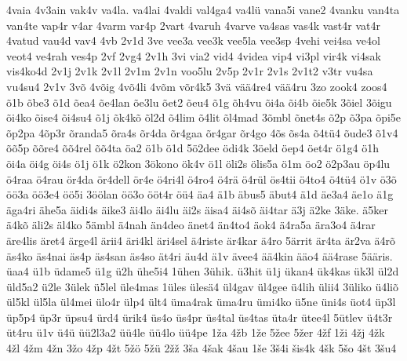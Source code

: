 {4vaia
4v3ain
vak4v
va4la.
va4lai
4valdi
val4ga4
va4lü
vana5i
vane2
4vanku
van4ta
van4te
vap4r
v4ar
4varm
var4p
2vart
4varuh
4varve
va4sas
vas4k
vast4r
vat4r
4vatud
vau4d
vav4
4vb
2v1d
3ve
vee3a
vee3k
vee5la
vee3sp
4vehi
vei4sa
ve4ol
veot4
ve4rah
ves4p
2vf
2vg4
2v1h
3vi
via2
vid4
4videa
vip4
vi3pl
vir4k
vi4sak
vis4ko4d
2v1j
2v1k
2v1l
2v1m
2v1n
voo5lu
2v5p
2v1r
2v1s
2v1t2
v3tr
vu4sa
vu4su4
2v1v
3võ
4võig
4võ4li
4võm
võr4k5
3vä
vää4re4
vää4ru
3zo
zook4
zoos4
õ1b
õbe3
õ1d
õea4
õe4lan
õe3lu
õet2
õeu4
õ1g
õh4vu
õi4a
õi4b
õie5k
3õiel
3õigu
õi4ko
õise4
õi4su4
õ1j
õk4kõ
õl2d
õ4lim
õ4lit
õl4mad
3õmbl
õnet4s
õ2p
õ3pa
õpi5e
õp2pa
4õp3r
õranda5
õra4s
õr4da
õr4gaa
õr4gar
õr4go
4õs
õs4a
õ4tü4
õude3
õ1v4
õõ5p
õõre4
õõ4rel
õõ4ta
öa2
ö1b
ö1d
5ö2dee
ödi4k
3öeld
öep4
öet4r
ö1g4
ö1h
öi4a
öi4g
öi4s
ö1j
ö1k
ö2kon
3ökono
ök4v
ö1l
öli2s
ölis5a
ö1m
öo2
ö2p3au
öp4lu
ö4raa
ö4rau
ör4da
ör4dell
ör4e
ö4ri4l
ö4ro4
ö4rä
ö4rül
ös4tii
ö4to4
ö4tü4
ö1v
ö3õ
öö3a
öö3e4
öö5i
3öölan
öö3o
ööt4r
öü4
äa4
ä1b
äbus5
äbut4
ä1d
äe3a4
äe1o
ä1g
äga4ri
ähe5a
äidi4s
äike3
äi4lo
äi4lu
äi2s
äisa4
äi4sõ
äi4tar
ä3j
ä2ke
3äke.
ä5ker
ä4kõ
äli2s
äl4ko
5ämbl
ä4nah
än4deo
änet4
än4to4
äok4
ä4ra5a
ära3o4
ä4rar
äre4lis
äret4
ärge4l
ärii4
äri4kl
äri4sel
ä4riste
är4kar
ä4ro
5ärrit
är4ta
är2va
ä4rõ
äs4ko
äs4nai
äs4p
äs4san
äs4so
ät4ri
äu4d
ä1v
ävee4
ää4kin
ääo4
ää4rase
5ääris.
üaa4
ü1b
üdame5
ü1g
ü2h
ühe5i4
1ühen
3ühik.
ü3hit
ü1j
ükan4
ük4kas
ük3l
ül2d
üld5a2
ü2le
3ülek
ü5lel
üle4mas
1üles
ülesä4
ül4gav
ül4gee
ü4lih
ülii4
3üliko
ü4liõ
ül5kl
ül5la
ül4mei
ülo4r
ülp4
ült4
üma4rak
üma4ru
ümi4ko
ü5ne
üni4s
üot4
üp3l
üp5p4
üp3r
üpsu4
ürd4
ürik4
üs4o
üs4pr
üs4tal
üs4tas
üta4r
ütee4l
5ütlev
ü4t3r
üt4ru
ü1v
ü4ü
üü2l3a2
üü4le
üü4lo
üü4pe
1ža
4žb
1že
5žee
5žer
4žf
1ži
4žj
4žk
4žl
4žm
4žn
3žo
4žp
4žt
5žö
5žü
2žž
3ša
4šak
4šau
1še
3š4i
šis4k
4šk
5šo
4št
3šu4
}
